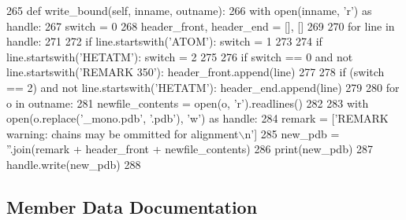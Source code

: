 \begin{DoxyCode}
265     \textcolor{keyword}{def }write\_bound(self, inname, outname):
266         with open(inname, \textcolor{stringliteral}{'r') as handle:}
267 \textcolor{stringliteral}{            switch = 0}
268 \textcolor{stringliteral}{            header\_front, header\_end = [], []}
269 \textcolor{stringliteral}{}
270 \textcolor{stringliteral}{            }\textcolor{keywordflow}{for} line \textcolor{keywordflow}{in} handle:
271 
272                 \textcolor{keywordflow}{if} line.startswith(\textcolor{stringliteral}{'ATOM'}): switch = 1
273 
274                 \textcolor{keywordflow}{if} line.startswith(\textcolor{stringliteral}{'HETATM'}): switch = 2
275 
276                 \textcolor{keywordflow}{if} switch == 0 \textcolor{keywordflow}{and} \textcolor{keywordflow}{not} line.startswith(\textcolor{stringliteral}{'REMARK 350'}): header\_front.append(line)
277 
278                 \textcolor{keywordflow}{if} (switch == 2) \textcolor{keywordflow}{and} \textcolor{keywordflow}{not} line.startswith(\textcolor{stringliteral}{'HETATM'}): header\_end.append(line)
279 
280         \textcolor{keywordflow}{for} o \textcolor{keywordflow}{in} outname:
281             newfile\_contents = open(o, \textcolor{stringliteral}{'r').readlines()}
282 \textcolor{stringliteral}{}
283 \textcolor{stringliteral}{            with open(o.replace('\_mono.pdb'}, \textcolor{stringliteral}{'.pdb'}), \textcolor{stringliteral}{'w'}) \textcolor{keyword}{as} handle:
284                 remark = [\textcolor{stringliteral}{'REMARK warning: chains may be ommitted for alignment\(\backslash\)n'}]
285                 new\_pdb = \textcolor{stringliteral}{''}.join(remark + header\_front + newfile\_contents)
286                 print(new\_pdb)
287                 handle.write(new\_pdb)
288 
\end{DoxyCode}


\subsection{Member Data Documentation}
\mbox{\label{classfragalysis__api_1_1xcimporter_1_1align_1_1_monomerize_a20636604f47438298d2420ce35297281}} 
